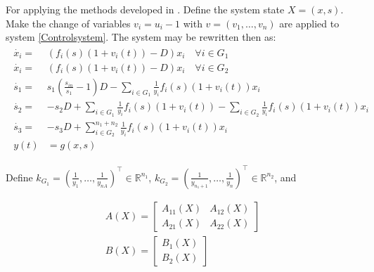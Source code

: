 \documentclass[3p,times]{article}
\newcommand{\R}{\mathbb{R}}
\begin{document}
For applying the methods developed in \cite{Cimen2004}. Define the system state $X = (x,s)$. Make the change of variables $v_i = u_i - 1$ with $v = (v_1,\dots,v_n)$ are applied to system \eqref{Controlsystem}. The system may be rewritten then as:
\begin{align} 
\begin{array}{cl}
\dot{x_i} =& \left(f_i(s)(1+v_i(t)) -D \right)x_i \quad \forall i \in G_1\\
\dot{x_i} =& \left(f_i(s)(1+v_i(t)) -D \right)x_i \quad \forall i \in G_2\\
\dot{s_1} =& \displaystyle s_1\left(\frac{s_{in}}{s_1}-1\right)D-\sum\limits_{i \in G_1}\frac{1}{y_i}f_i(s)(1+v_i(t)) x_i  \\
\dot{s_2} = & \displaystyle -s_2D+\sum\limits_{i \in G_1}\frac{1}{y_i}f_i(s)(1+v_i(t))	-\sum\limits_{i \in G_2}\frac{1}{y_i}f_i(s)(1+v_i(t)) x_i  \\
\dot{s_3} =&  \displaystyle -s_3D+\sum\limits_{i \in G_2}^{n_1+n_2}\frac{1}{y_i}f_i(s)(1+v_i(t)) x_i \\
y(t) & = g(x,s)
\end{array}
\end{align}	

Define $k_{G_1} = \left ( \frac{1}{y_1},\dots,\frac{1}{y_{nA}}\right )^\top \in \R^{n_1}$,  $k_{G_2} = \left(\frac{1}{y_{n_1+1}},\dots,\frac{1}{y_{n}}\right )^\top \in \R^{n_2}$, and

\begin{align}
\label{A_matrix} A\left (X\right) = \begin{bmatrix}
A_{11}(X) & A_{12}(X) \\ A_{21}(X) & A_{22}(X)
\end{bmatrix} \\
\label{B_matrix} B\left (X\right) = \begin{bmatrix}
B_1(X) \\ B_2(X)
\end{bmatrix} 
\end{align}
\end{document}
